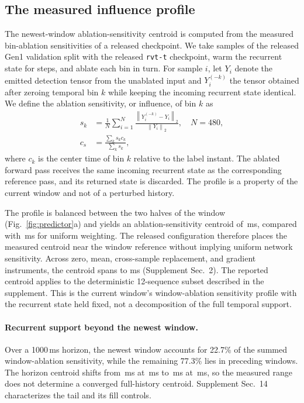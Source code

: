 \documentclass[10pt,twocolumn,letterpaper]{article}
\begin{document}
\subsection{The measured influence profile}
\label{sec:influence}

The newest-window ablation-sensitivity centroid is computed from the measured
bin-ablation sensitivities of a released checkpoint. We take \rvtInfluenceSamples{} samples of the released Gen1
validation split with the released \texttt{rvt-t} checkpoint, warm the recurrent
state for \rvtWarmSteps{} steps, and ablate each bin in turn. For sample $i$, let
$Y_i$ denote the emitted detection tensor from the unablated input and
$Y_i^{(-k)}$ the tensor obtained after zeroing temporal bin $k$ while keeping the
incoming recurrent state identical. We define the ablation sensitivity, or influence, of bin $k$ as
\begin{equation}
\begin{aligned}
s_k&=\frac{1}{N}\sum_{i=1}^{N}
\frac{\left\|Y_i^{(-k)}-Y_i\right\|_2}{\left\|Y_i\right\|_2},\quad N=480,\\
c_s&=\frac{\sum_k s_k c_k}{\sum_k s_k},
\end{aligned}
\end{equation}
where $c_k$ is the center time of bin $k$ relative to the label instant. The
ablated forward pass receives the same incoming recurrent state as the
corresponding reference pass, and its returned state is discarded. The profile is
a property of the current window and not of a perturbed history.

The profile is balanced between the two halves of the window (Fig.~\ref{fig:predictor}a)
and yields an ablation-sensitivity centroid of \rvtCentroidMeas\,ms, compared
with \rvtCentroidUnif\,ms for uniform weighting. The released configuration
therefore places the measured centroid near the window reference without implying
uniform network sensitivity.
Across zero, mean, cross-sample replacement, and gradient instruments, the centroid spans
\occMean{} to \occGrad{} ms (Supplement Sec.~2).
The reported centroid applies to the deterministic 12-sequence subset described in the supplement.
This is the current window's window-ablation sensitivity profile with the recurrent
state held fixed, not a decomposition of the full temporal support.

\paragraph{Recurrent support beyond the newest window.}
Over a 1000\,ms horizon, the newest window accounts for 22.7\% of the summed
window-ablation sensitivity, while the remaining 77.3\% lies in preceding windows. The
horizon centroid shifts from
\histCentroidTen\,ms at \histHorizonA\,ms to \histCentroidTwenty\,ms at \histHorizonB\,ms,
so the measured range does not determine a converged full-history centroid. Supplement Sec.~14
characterizes the tail and its fill controls.
\end{document}
